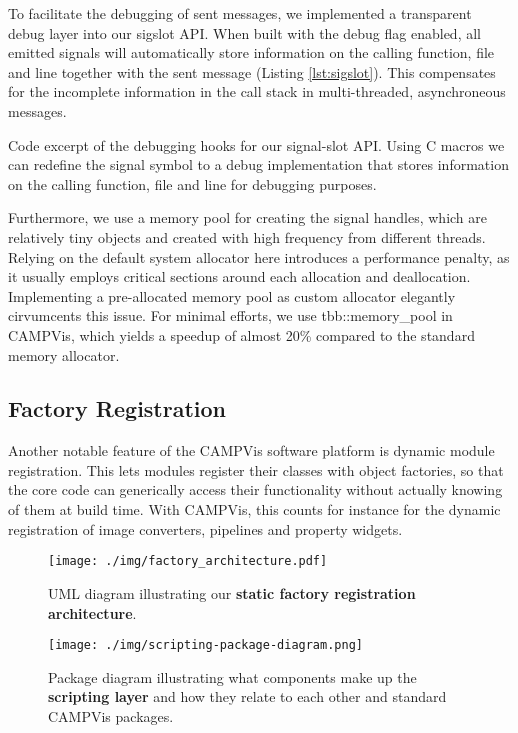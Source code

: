 To facilitate the debugging of sent messages, we implemented a transparent debug layer into our sigslot API.
When built with the debug flag enabled, all emitted signals will automatically store information on the calling function, file and line together with the sent message (Listing \ref{lst:sigslot}).
This compensates for the incomplete information in the call stack in multi-threaded, asynchroneous messages.

\begin{listing}[hbt]
	\caption{
		Code excerpt of the debugging hooks for our signal-slot API.
		Using C macros we can redefine the signal symbol to a debug implementation that stores information on the calling function, file and line for debugging purposes.
	}
	\label{lst:sigslot}
\end{listing}

Furthermore, we use a memory pool for creating the signal handles, which are relatively tiny objects and created with high frequency from different threads.
Relying on the default system allocator here introduces a performance penalty, as it usually employs critical sections around each allocation and deallocation.
Implementing a pre-allocated memory pool as custom allocator elegantly cirvumcents this issue.
For minimal efforts, we use tbb::memory\_pool in CAMPVis, which yields a speedup of almost 20\% compared to the standard memory allocator.


\subsection{Factory Registration}
\label{sec:registration}
Another notable feature of the CAMPVis software platform is dynamic module registration. 
This lets modules register their classes with object factories, so that the core code can generically access their functionality without actually knowing of them at build time.
With CAMPVis, this counts for instance for the dynamic registration of image converters, pipelines and property widgets.

\begin{figure}[ht]
	\centering
	\texttt{[image: ./img/factory\_architecture.pdf]}
	\caption{UML diagram illustrating our \textbf{static factory registration architecture}.}
	\label{fig:factory-registration}
\end{figure}

\begin{figure*}[htb]
	\centering
	\texttt{[image: ./img/scripting-package-diagram.png]}
	\caption{Package diagram illustrating what components make up the \textbf{scripting layer} and how they relate to each other and standard CAMPVis packages.}
	\label{fig:scripting-package}
\end{figure*}

